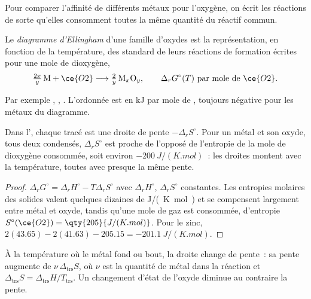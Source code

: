 Pour comparer l'affinité de différents métaux pour l'oxygène, on écrit les réactions
de sorte qu'elles consomment toutes la même quantité du réactif commun.

\begin{definition}\label{def:b2:ellingham:diagram}
Le \emph{diagramme d'Ellingham} d'une famille d'oxydes
est la représentation, en fonction de la température, des  standard de leurs
réactions de formation écrites pour une mole de dioxygène,
\[
  \tfrac{2x}{y}\,\mathrm M + \ce{O2} \longrightarrow \tfrac{2}{y}\,\mathrm{M}_x\mathrm O_y ,
  \qquad \Delta_r G^\circ(T) \ \text{par mole de } \ce{O2} .
\]
\end{definition}

Par exemple , , . L'ordonnée est en \unit{kJ} par mole de , toujours négative pour les
métaux du diagramme.

\begin{proposition}\label{prop:b2:ellingham:line}
Dans l', chaque tracé est une droite de pente $-\Delta_r
S^\circ$. Pour un métal et son oxyde, tous deux condensés, $\Delta_r S^\circ$ est
proche de l'opposé de l'entropie de la mole de dioxygène consommée, soit environ
$-\qty{200}{J/(K.mol)}$~: les droites montent avec la température, toutes avec presque la
même pente.
\end{proposition}

\begin{proof}
$\Delta_r G^\circ = \Delta_r H^\circ - T\Delta_r S^\circ$ avec $\Delta_r
H^\circ$, $\Delta_r S^\circ$ constantes. Les entropies molaires des solides valent quelques dizaines de
\unit{J/(K.mol)} et se compensent largement entre métal et oxyde, tandis qu'une mole de
gaz est consommée, d'entropie $S^\circ(\ce{O2}) = \qty{205}{J/(K.mol)}$. Pour le zinc,
$2(43.65) - 2(41.63) - 205.15 = \qty{-201.1}{J/(K.mol)}$.
\end{proof}

\begin{proposition}\label{prop:b2:ellingham:break}
À la température où le métal fond ou bout, la droite change de pente~:
sa pente augmente de $\nu\,\Delta_{\text{trs}}S$, où $\nu$ est la quantité de
métal dans la réaction et $\Delta_{\text{trs}}S = \Delta_{\text{trs}}H/T_{\text{trs}}$.
Un changement d'état de l'oxyde diminue au contraire la pente.
\end{proposition}

